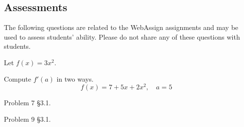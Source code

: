 \documentclass[12pt,addpoints, answers, fleqn]{exam}
\begin{document}
\begin{teacher}
\subsection{Assessments}
The following questions are related to the WebAssign assignments and may be used to assess students' ability. Please do not share any of these questions with students.
\begin{questions}		
\question 	%


Let $f\left(x\right) = 3x^2$.

\question 	%

Compute $f'\left(a\right)$ in two ways.
\[
f\left(x\right) = 7 + 5x + 2x^2, \quad a = 5
\]

\question 	%

Problem 7 \S3.1.

\question 	%

Problem 9 \S3.1.

\question 	%


\end{questions}
\end{teacher}
\end{document}

